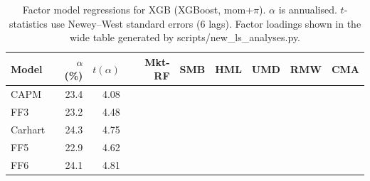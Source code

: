\begin{table}[H]
\centering
\small
\begin{tabular}{l r r r r r r r r}
\toprule
Model & $\alpha$ (\%) & $t(\alpha)$ & Mkt-RF & SMB & HML & UMD & RMW & CMA \\
\midrule
CAPM & 23.4 & 4.08 &   &   &   &   &   &   \\
FF3 & 23.2 & 4.48 &   &   &   &   &   &   \\
Carhart & 24.3 & 4.75 &   &   &   &   &   &   \\
FF5 & 22.9 & 4.62 &   &   &   &   &   &   \\
FF6 & 24.1 & 4.81 &   &   &   &   &   &   \\
\bottomrule
\end{tabular}
\caption{Factor model regressions for XGB (XGBoost, mom+$\pi$). $\alpha$ is annualised. $t$-statistics use Newey--West standard errors (6 lags). Factor loadings shown in the wide table generated by scripts/new_ls_analyses.py.}
\label{tab:factor_alphas}
\end{table}
